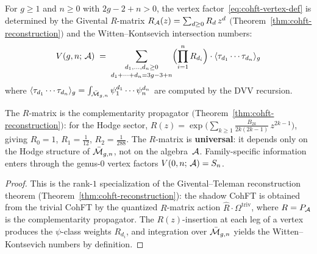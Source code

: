 \begin{proposition}%
\label{prop:givental-vertex-reconstruction}%
\ClaimStatusProvedHere%
%
For $g \geq 1$ and $n \geq 0$ with $2g-2+n > 0$,
the vertex factor~\eqref{eq:cohft-vertex-def} is
determined by the Givental $R$-matrix
$R_{\mathcal{A}}(z) = \sum_{d \geq 0} R_d\, z^d$
$($Theorem~\ref{thm:cohft-reconstruction}$)$
and the Witten--Kontsevich intersection numbers:
\begin{equation}\label{eq:givental-vertex-formula}
V(g,n;\,\mathcal{A})
\;=\;
\sum_{\substack{d_1,\ldots,d_n \geq 0 \\[2pt]
d_1+\cdots+d_n = 3g-3+n}}
\Bigl(\prod_{i=1}^n R_{d_i}\Bigr)
\cdot
\langle\tau_{d_1}\cdots\tau_{d_n}\rangle_g
\end{equation}
where
$\langle\tau_{d_1}\cdots\tau_{d_n}\rangle_g
= \int_{\bar{\mathcal{M}}_{g,n}}
\psi_1^{d_1}\cdots\psi_n^{d_n}$
are computed by the DVV recursion.

The $R$-matrix is the complementarity propagator
$($Theorem~\ref{thm:cohft-reconstruction}$)$:
for the Hodge sector,
$R(z) = \exp\!\bigl(\sum_{k \geq 1}
\tfrac{B_{2k}}{2k(2k-1)}\,z^{2k-1}\bigr)$,
giving
$R_0 = 1$,
$R_1 = \tfrac{1}{12}$,
$R_2 = \tfrac{1}{288}$.
The $R$-matrix is \textbf{universal}:
it depends only on the Hodge structure of
$\bar{\mathcal{M}}_{g,n}$, not on the algebra~$\mathcal{A}$.
Family-specific information enters through the
genus-$0$ vertex factors $V(0,n;\,\mathcal{A}) = S_n$.
\end{proposition}

\begin{proof}
This is the rank-$1$ specialization of the
Givental--Teleman reconstruction theorem
(Theorem~\ref{thm:cohft-reconstruction}):
the shadow CohFT is obtained from the trivial CohFT
by the quantized $R$-matrix action
$\hat{R} \cdot \Omega^{\mathrm{triv}}$,
where $R = P_{\mathcal{A}}$ is the complementarity propagator.
The $R(z)$-insertion at each leg of a vertex
produces the $\psi$-class weights $R_{d_i}$, and
integration over $\bar{\mathcal{M}}_{g,n}$ yields the
Witten--Kontsevich numbers by definition.
\end{proof}

